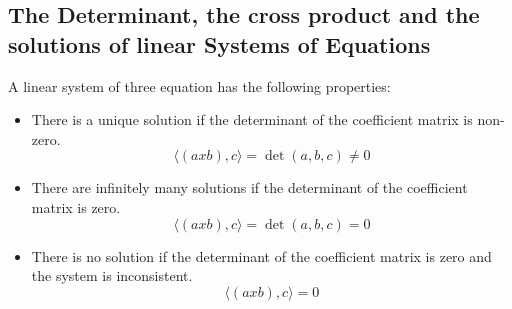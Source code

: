 \subsection{The Determinant, the cross product and the solutions of linear Systems of Equations}
A linear system of three equation has the following properties:

\begin{itemize}[label=\(-\)]
	\item There is a unique solution if the determinant of the coefficient matrix is non-zero. 
	\[\langle (a x b), c\rangle = \det(a,b,c) \ne 0\]
	\item There are infinitely many solutions if the determinant of the coefficient matrix is zero.
	\[\langle (a x b), c\rangle = \det(a,b,c) = 0\]
	\item There is no solution if the determinant of the coefficient matrix is zero and the system is inconsistent.
	\[\langle (a x b), c\rangle = 0\]
\end{itemize}
